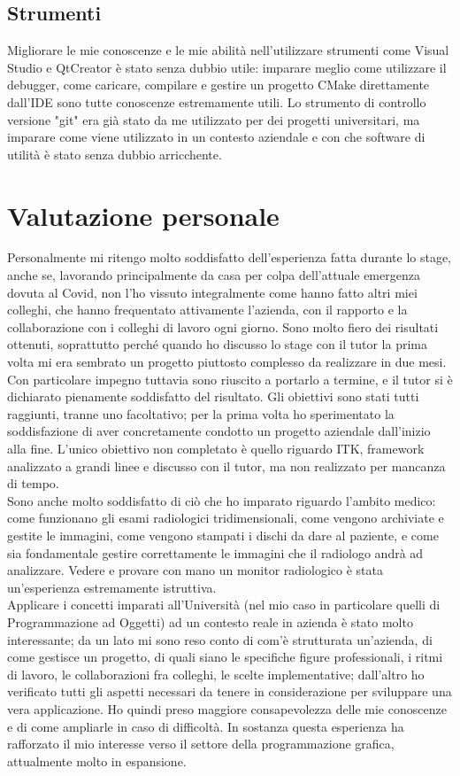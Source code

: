 \subsection{Strumenti}
Migliorare le mie conoscenze e le mie abilità nell'utilizzare strumenti come Visual Studio e QtCreator è stato senza dubbio utile: imparare meglio come utilizzare il debugger, come caricare, compilare e gestire un progetto CMake direttamente dall'IDE sono tutte conoscenze estremamente utili. Lo strumento di controllo versione "git" era già stato da me utilizzato per dei progetti universitari, ma imparare come viene utilizzato in un contesto aziendale e con che software di utilità è stato senza dubbio arricchente.

\section{Valutazione personale}
Personalmente mi ritengo molto soddisfatto dell'esperienza fatta durante lo stage, anche se, lavorando principalmente da casa per colpa dell'attuale emergenza dovuta al Covid, non l'ho vissuto integralmente come hanno fatto altri miei colleghi, che hanno frequentato attivamente l'azienda, con il rapporto e la collaborazione con i colleghi di lavoro ogni giorno. Sono molto fiero dei risultati ottenuti, soprattutto perché quando ho discusso lo stage con il tutor la prima volta mi era sembrato un progetto piuttosto complesso da realizzare in due mesi. Con particolare impegno tuttavia sono riuscito a portarlo a termine, e il tutor si è dichiarato pienamente soddisfatto del risultato. Gli obiettivi sono stati tutti raggiunti, tranne uno facoltativo; per la prima volta ho sperimentato la soddisfazione di aver concretamente condotto un progetto aziendale dall'inizio alla fine. L'unico obiettivo non completato è quello riguardo ITK, framework analizzato a grandi linee e discusso con il tutor, ma non realizzato per mancanza di tempo.
\\
Sono anche molto soddisfatto di ciò che ho imparato riguardo l'ambito medico: come funzionano gli esami radiologici tridimensionali, come vengono archiviate e gestite le immagini, come vengono stampati i dischi da dare al paziente, e come sia fondamentale gestire correttamente le immagini che il radiologo andrà ad analizzare. Vedere e provare con mano un monitor radiologico è stata un'esperienza estremamente istruttiva.
\\
Applicare i concetti imparati all’Università (nel mio caso in particolare quelli di
Programmazione ad Oggetti) ad un contesto reale in azienda è stato molto interessante;
da un lato mi sono reso conto di com’è strutturata un’azienda, di come gestisce un progetto, di quali siano le specifiche figure professionali, i ritmi di lavoro, le collaborazioni fra colleghi, le scelte implementative; dall’altro ho verificato tutti gli aspetti necessari da tenere in considerazione per sviluppare una vera applicazione. Ho quindi preso maggiore consapevolezza delle mie conoscenze e di come ampliarle in caso di difficoltà. In sostanza questa esperienza ha rafforzato il mio interesse verso il settore della programmazione grafica, attualmente molto in espansione.

